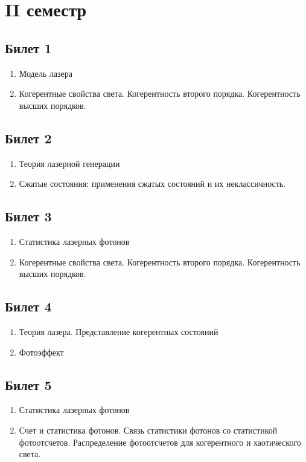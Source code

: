 \documentclass[12pt,a4paper]{article}
\begin{document}
\section*{II семестр}

\subsection*{Билет 1} 
\begin{enumerate}
\item Модель лазера
\item Когерентные свойства света.
 Когерентность второго порядка.
 Когерентность высших порядков.
\end{enumerate}

\subsection*{Билет 2} 
\begin{enumerate}
\item Теория лазерной генерации
\item Сжатые состояния: применения сжатых состояний и их
  неклассичность. 
\end{enumerate}

\subsection*{Билет 3} 
\begin{enumerate}
\item Статистика лазерных фотонов
\item Когерентные свойства света.
 Когерентность второго порядка.
 Когерентность высших порядков.
\end{enumerate}

\subsection*{Билет 4} 
\begin{enumerate}
\item Теория лазера. Представление когерентных состояний
\item Фотоэффект
\end{enumerate}

\subsection*{Билет 5} 
\begin{enumerate}
\item Статистика лазерных фотонов
\item Счет и статистика фотонов.
Связь статистики фотонов со статистикой фотоотсчетов.
Распределение фотоотсчетов для когерентного и хаотического
  света.
\end{enumerate}
\end{document}
